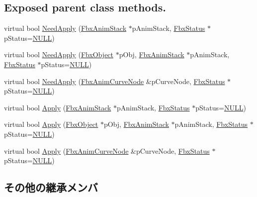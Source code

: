 \subsection*{Exposed parent class methods.}
\begin{DoxyCompactItemize}
\item 
virtual bool \hyperlink{class_fbx_anim_curve_filter_key_sync_a987ccf74bf3bdf7828812067d895950c}{Need\+Apply} (\hyperlink{class_fbx_anim_stack}{Fbx\+Anim\+Stack} $\ast$p\+Anim\+Stack, \hyperlink{class_fbx_status}{Fbx\+Status} $\ast$p\+Status=\hyperlink{fbxarch_8h_a070d2ce7b6bb7e5c05602aa8c308d0c4}{N\+U\+LL})
\item 
virtual bool \hyperlink{class_fbx_anim_curve_filter_key_sync_a1b541b170fcb33fb1bc2daf43ec08347}{Need\+Apply} (\hyperlink{class_fbx_object}{Fbx\+Object} $\ast$p\+Obj, \hyperlink{class_fbx_anim_stack}{Fbx\+Anim\+Stack} $\ast$p\+Anim\+Stack, \hyperlink{class_fbx_status}{Fbx\+Status} $\ast$p\+Status=\hyperlink{fbxarch_8h_a070d2ce7b6bb7e5c05602aa8c308d0c4}{N\+U\+LL})
\item 
virtual bool \hyperlink{class_fbx_anim_curve_filter_key_sync_a72cb983cb554a070688eb0990d4b7576}{Need\+Apply} (\hyperlink{class_fbx_anim_curve_node}{Fbx\+Anim\+Curve\+Node} \&p\+Curve\+Node, \hyperlink{class_fbx_status}{Fbx\+Status} $\ast$p\+Status=\hyperlink{fbxarch_8h_a070d2ce7b6bb7e5c05602aa8c308d0c4}{N\+U\+LL})
\item 
virtual bool \hyperlink{class_fbx_anim_curve_filter_key_sync_a4eb3dd7372f7747bcae1be8722db75e0}{Apply} (\hyperlink{class_fbx_anim_stack}{Fbx\+Anim\+Stack} $\ast$p\+Anim\+Stack, \hyperlink{class_fbx_status}{Fbx\+Status} $\ast$p\+Status=\hyperlink{fbxarch_8h_a070d2ce7b6bb7e5c05602aa8c308d0c4}{N\+U\+LL})
\item 
virtual bool \hyperlink{class_fbx_anim_curve_filter_key_sync_a0a46860b4847773c09ea2c57f77f11dd}{Apply} (\hyperlink{class_fbx_object}{Fbx\+Object} $\ast$p\+Obj, \hyperlink{class_fbx_anim_stack}{Fbx\+Anim\+Stack} $\ast$p\+Anim\+Stack, \hyperlink{class_fbx_status}{Fbx\+Status} $\ast$p\+Status=\hyperlink{fbxarch_8h_a070d2ce7b6bb7e5c05602aa8c308d0c4}{N\+U\+LL})
\item 
virtual bool \hyperlink{class_fbx_anim_curve_filter_key_sync_ad85aff7b0cd6b4ce563002b6d52c0041}{Apply} (\hyperlink{class_fbx_anim_curve_node}{Fbx\+Anim\+Curve\+Node} \&p\+Curve\+Node, \hyperlink{class_fbx_status}{Fbx\+Status} $\ast$p\+Status=\hyperlink{fbxarch_8h_a070d2ce7b6bb7e5c05602aa8c308d0c4}{N\+U\+LL})
\end{DoxyCompactItemize}
\subsection*{その他の継承メンバ}


